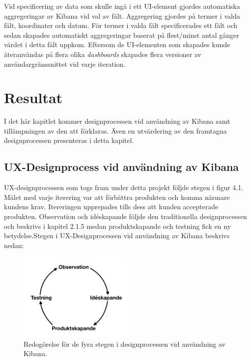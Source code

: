 \documentclass[12pt]{kththesis}
\begin{document}
Vid specificering av data som skulle ingå i ett UI-element gjordes automatiska aggregeringar av Kibana vid val av fält. Aggregering gjordes på termer i valda fält, koordinater och datum. För termer i valda fält specificerades ett fält och sedan skapades automatiskt aggregeringar baserat på flest/minst antal gånger värdet i detta fält uppkom. Eftersom de UI-elementen som skapades kunde återanvändas på flera olika \textit{dashboards} skapades flera versioner av användargränssnittet vid varje iteration. 

\chapter{Resultat}

I det här kapitlet kommer designprocessen vid användning av Kibana samt tillämpningen av den att förklaras. Även en utvärdering av den framtagna designprocessen presenteras i detta kapitel.  

\section{UX-Designprocess vid användning av Kibana}

UX-designprocessen som togs fram under detta projekt följde stegen i figur 4.1. Målet med varje iterering var att förbättra produkten och komma närmare kundens krav. Itereringen upprepades tills dess att kunden accepterade produkten. Observation och idéskapande följde den traditionella designprocessen och beskrivs i kapitel 2.1.5 medan produktskapande och testning fick en ny betydelse.Stegen i UX-Designprocessen vid användning av Kibana beskrivs nedan:

\begin{figure}[h]

\centering
\includegraphics[width=0.5\textwidth]{ProductCreation}
\caption{Redogörelse för de fyra stegen i designprocessen vid användning av Kibana.}
\end{figure}
\end{document}

